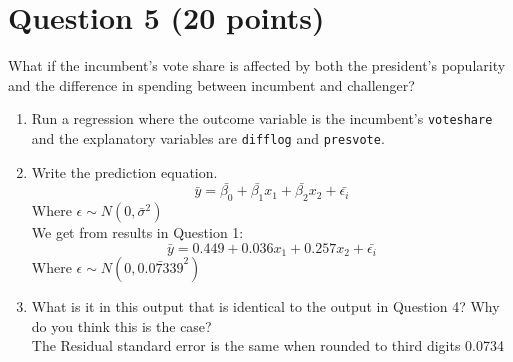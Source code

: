 \documentclass[12pt,letterpaper]{article}
\begin{document}
	\newpage	

\section*{Question 5 (20 points)}
\noindent What if the incumbent's vote share is affected by both the president's popularity and the difference in spending between incumbent and challenger? 
	\begin{enumerate}
		\item Run a regression where the outcome variable is the incumbent's \texttt{voteshare} and the explanatory variables are \texttt{difflog} and \texttt{presvote}.
					
		\vspace{.5cm}
		
		\item Write the prediction equation.
		$$\bar{y} = \bar{\beta_0} + \bar{\beta_1}x_1 + \bar{\beta_2}x_2 + \bar{\epsilon_i}$$ Where $\epsilon \sim N(0, \bar{\sigma}^2)$
		\vspace{.5cm}		
		\\We get from results in Question 1:
		$$\bar{y} = 0.449 + 0.036x_1 + 0.257x_2 + \bar{\epsilon_i}$$ Where $\epsilon \sim N(0, \bar{0.07339}^2)$
		\vspace{.5cm}
		
		\item What is it in this output that is identical to the output in Question 4? Why do you think this is the case?
		\vspace{.5cm}
		\\The Residual standard error is the same when rounded to third digits 0.0734	
	\end{enumerate}
\end{document}
